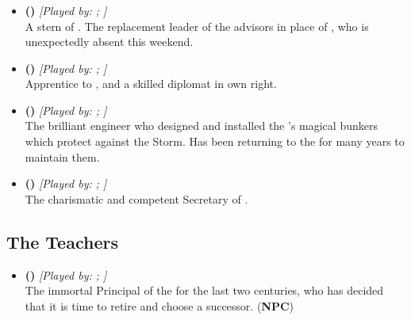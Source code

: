 \documentclass[blue]{GL2020}
\begin{document}
\subsubsection*{\pShip{}}
\begin{itemize}
    \item \textbf{\cEbbPriest{\full} (\cEbbPriest{\MYcharpronouns})} \textit{[Played by: \cEbbPriest{\MYplayer}; \cEbbPriest{\MYplayerpronouns}]}\\ A stern \cEbbPriest{\cleric} of \cEbb{}. The replacement leader of the \pShip{} advisors in place of \cHeadDiplomat{\full}, who is unexpectedly absent this weekend.

    \item \textbf{\cJuniorStatesman{\full} (\cJuniorStatesman{\MYcharpronouns})} \textit{[Played by: \cJuniorStatesman{\MYplayer}; \cJuniorStatesman{\MYplayerpronouns}]}\\ Apprentice to \cHeadDiplomat{}, and a skilled diplomat in \cJuniorStatesman{\their} own right.
    
    \item \textbf{\cBunker{\full} (\cBunker{\MYcharpronouns})} \textit{[Played by: \cBunker{\MYplayer}; \cBunker{\MYplayerpronouns}]}\\ The brilliant engineer who designed and installed the \pSc{}'s magical bunkers which protect against the Storm. Has been returning to the \pSc{} for many years to maintain them.
    
    \item \textbf{\cChupLeader{\full} (\cChupLeader{\MYcharpronouns})} \textit{[Played by: \cChupLeader{\MYplayer}; \cChupLeader{\MYplayerpronouns}]}\\ The charismatic and competent Secretary of \cHeadDiplomat{}.

\end{itemize}

\subsection*{The Teachers}

\begin{itemize}
    \item \textbf{\cPrincipal{\full} (\cPrincipal{\MYcharpronouns})} \textit{[Played by: \cPrincipal{\MYplayer}; \cPrincipal{\MYplayerpronouns}]}\\ The immortal Principal of the \pSc{} for the last two centuries, who has decided that it is time to retire and choose a successor. (\textbf{NPC})
\end{itemize}
\end{document}
